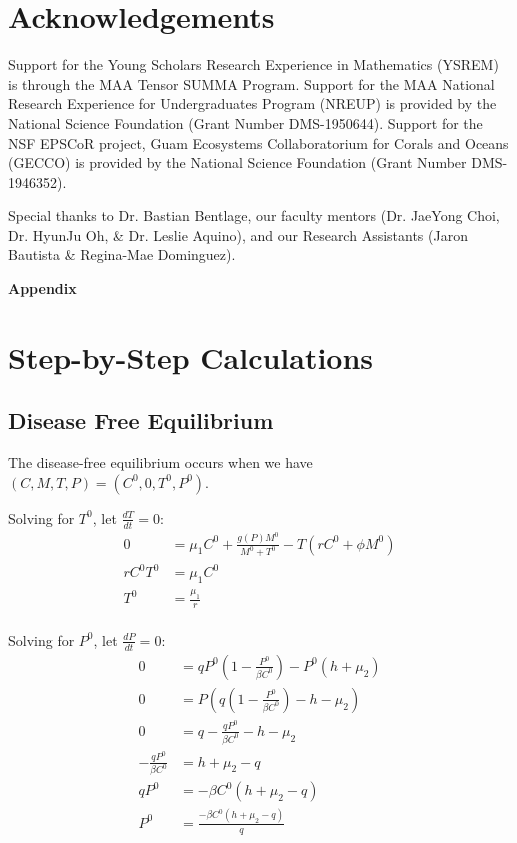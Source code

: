 \documentclass[12pt]{article}
\begin{document}
\section{Acknowledgements}
Support for the Young Scholars Research Experience in Mathematics (YSREM)  is through the MAA Tensor SUMMA Program. Support for the MAA National Research Experience for Undergraduates Program (NREUP) is provided by the National Science Foundation (Grant Number DMS-1950644). Support for the NSF EPSCoR project, Guam Ecosystems Collaboratorium for Corals and Oceans (GECCO) is provided by the National Science Foundation (Grant Number DMS-1946352). \par
Special thanks to Dr. Bastian Bentlage, our faculty mentors (Dr. JaeYong Choi, Dr. HyunJu Oh, \& Dr. Leslie Aquino), and our Research Assistants (Jaron Bautista \& Regina-Mae Dominguez).

\newpage
\appendix
    {\huge \textbf{Appendix}}
    \section{Step-by-Step Calculations}
    \subsection{Disease Free Equilibrium}
        \label{appendix:A1}
        The disease-free equilibrium occurs when we have $(C, M, T, P) = (C^{0}, 0, T^{0}, P^{0})$. 

        Solving for $T^{0}$, let $\frac{dT}{dt} = 0$: 
            \begin{align*}
                0 &= \mu_{1}C^{0} + \frac{g(P)M^{0}}{M^{0} + T^{0}} - T(rC^{0} + \phi M^{0}) \\
                rC^{0}T^{0} &= \mu_{1}C^{0} \\
                T^{0} &= \frac{\mu_{1}}{r} \\
            \end{align*}
            
        Solving for $P^{0}$, let $\frac{dP}{dt} = 0$:
            \begin{align*}
                0 &= qP^{0} \left( 1-\frac{P^{0}}{\beta C^{0}}\right) - P^{0}(h + \mu_{2}) \\
                0 &= P\left( q\left(1- \frac{P^{0}}{\beta C^{0}} \right) - h - \mu_{2} \right) \\
                0 &= q - \frac{qP^{0}}{\beta C^{0}} - h - \mu_{2} \\
                -\frac{qP^{0}}{\beta C^{0}} &= h + \mu_{2} -q \\
                qP^{0} &= -\beta C^{0}(h + \mu_{2} - q) \\
                P^{0} &= \frac{-\beta C^{0}(h + \mu_{2} - q)}{q}
            \end{align*}
            
\end{document}
